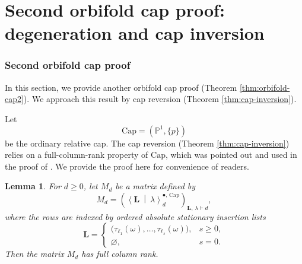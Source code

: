 \documentclass[letterpaper,12pt]{amsart}
\newtheorem{lem}[thm]{Lemma}
\theoremstyle{definition}
\newcommand{\PP}{\mathbb P}
\newcommand{\cC}{\mathcal C}
\numberwithin{equation}{section}
\begin{document}



{\large \part{Second orbifold cap proof: degeneration and cap inversion}\label{part:cap-inversion-proof}}

\section{Second orbifold cap proof}
\label{sec:cap-inversion}

In this section, we provide another orbifold cap proof (Theorem \ref{thm:orbifold-cap2}). We approach this result by cap reversion (Theorem \ref{thm:cap-inversion}).

Let
\[
\mathrm{Cap}=(\PP^1,\{p\})
\]
be the ordinary relative cap. The cap reversion (Theorem \ref{thm:cap-inversion}) relies on a full-column-rank property of $\mathrm{Cap}$, which was pointed out and used in the proof of \cite[Proposition~1.3]{OP3}. We provide the proof here for convenience of readers. 


\begin{lem}
\label{lem:stationary-cap-rank}
For \(d\ge0\), let $M_d$ be a matrix defined by
\[
M_d=
\left(
\left\langle
\mathbf L
\ \middle|\
\lambda
\right\rangle^{\bullet,\,\mathrm{Cap}}_d
\right)_{\mathbf L,\,\lambda\vdash d},
\]
where the rows are indexed by ordered absolute stationary insertion lists
\[
\mathbf L=\begin{cases}
\bigl(
\tau_{\ell_1}(\omega),\ldots,\tau_{\ell_s}(\omega)
\bigr),&s\geq0,\\
\varnothing,&s=0.
\end{cases}
\]
Then the matrix \(M_d\) has full column rank.
\end{lem}
\end{document}
